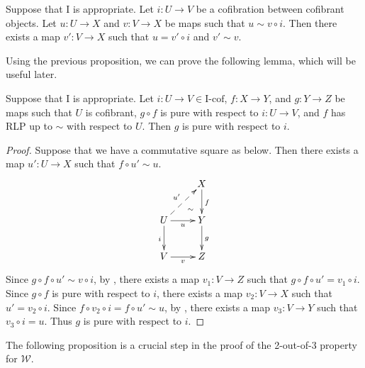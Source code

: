 \documentclass{amsart}
\theoremstyle{definition}
\newcommand{\we}{\mathcal{W}}
\newcommand{\I}{\mathrm{I}}
\newcommand{\class}[2]{#1\text{-}\mathrm{#2}}
\newcommand{\Icof}[1][\I]{\class{#1}{cof}}
\begin{document}
\begin{cor}
Suppose that $\I$ is appropriate.
Let $i : U \to V$ be a cofibration between cofibrant objects.
Let $u : U \to X$ and $v : V \to X$ be maps such that $u \sim v \circ i$.
Then there exists a map $v' : V \to X$ such that $u = v' \circ i$ and $v' \sim v$.
\end{cor}

Using the previous proposition, we can prove the following lemma, which will be useful later.

\begin{lem}
Suppose that $\I$ is appropriate.
Let $i : U \to V \in \Icof$, $f : X \to Y$, and $g : Y \to Z$ be maps such that $U$ is cofibrant, $g \circ f$
is pure with respect to $i : U \to V$, and $f$ has RLP up to $\sim$ with respect to $U$.
Then $g$ is pure with respect to $i$.
\end{lem}
\begin{proof}
Suppose that we have a commutative square as below.
Then there exists a map $u' : U \to X$ such that $f \circ u' \sim u$.
\[ \xymatrix{   \ar@{}[dr]|(.7){\sim}                & X \ar[d]^f \\
              U \ar@{-->}[ur]^{u'} \ar[d]_i \ar[r]_u & Y \ar[d]^g \\
              V \ar[r]_v                             & Z
            } \]
Since $g \circ f \circ u' \sim v \circ i$, by , there
exists a map $v_1 : V \to Z$ such that $g \circ f \circ u' = v_1 \circ i$.
Since $g \circ f$ is pure with respect to $i$, there exists a map $v_2 : V \to X$ such that $u' = v_2 \circ i$.
Since $f \circ v_2 \circ i = f \circ u' \sim u$, by ,
there exists a map $v_3 : V \to Y$ such that $v_3 \circ i = u$.
Thus $g$ is pure with respect to $i$.
\end{proof}

The following proposition is a crucial step in the proof of the 2-out-of-3 property for $\we$.
\end{document}
